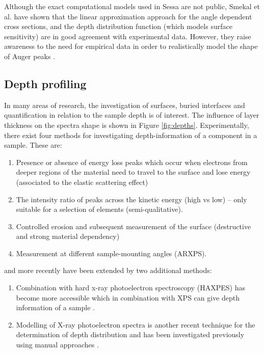 Although the exact computational models used in Sessa are not public, Smekal et al. have shown that the linear approximation approach for the angle dependent cross sections, and the depth distribution function (which models surface sensitivity) are in good agreement with experimental data. However, they raise awareness to the need for empirical data in order to realistically model the shape of Auger peaks \cite{smekal_simulation_2005}. 

\subsection{Depth profiling}
In many areas of research, the investigation of surfaces, buried interfaces and quantification in relation to the sample depth is of interest. The influence of layer thickness on the spectra shape is shown in Figure \ref{fig:depths}. Experimentally, there exist four methods for investigating depth-information of a component in a sample. These are:
\begin{enumerate}
    \item Presence or absence of energy loss peaks which occur when electrons from deeper regions of the material need to travel to the surface and lose energy (associated to the elastic scattering effect)
    \item The intensity ratio of peaks across the kinetic energy (high vs low) – only suitable for a selection of elements (semi-qualitative).
    \item Controlled erosion and subsequent measurement of the surface (destructive and strong material dependency)
    \item Measurement at different sample-mounting angles (ARXPS). \cite{moulder_handbook_1992} 
    \end{enumerate}
and more recently have been extended by two additional methods:
\begin{enumerate}[resume]
    \item Combination with hard x-ray photoelectron spectroscopy (HAXPES) has become more accessible which in combination with XPS can give depth information of a sample \cite{zborowski_improved_2022}.
    \item Modelling of X-ray photoelectron spectra is another recent technique for the determination of depth distribution and has been investigated previously using manual approaches \cite{zborowski_comparison_2022}.

\end{enumerate}


